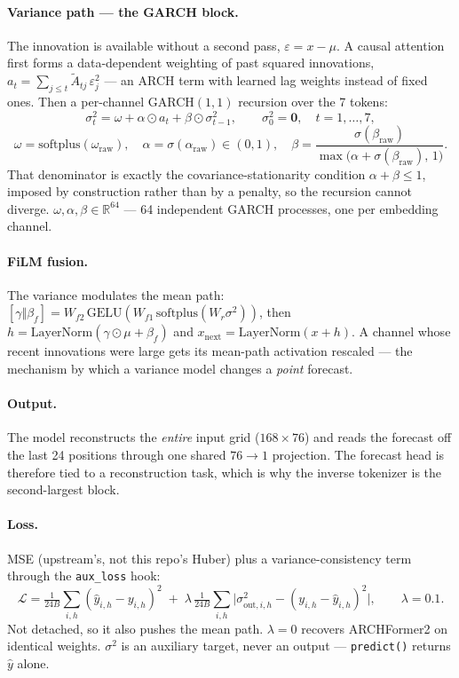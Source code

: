 \documentclass[11pt]{article}
\newcommand{\R}{\mathbb{R}}
\newcommand{\Loss}{\mathcal{L}}
\newcommand{\code}[1]{\texttt{\small #1}}
\newcommand{\LN}{\mathrm{LayerNorm}}
\begin{document}
\paragraph{Variance path --- the GARCH block.} The innovation is available without a
second pass, $\varepsilon = x - \mu$. A causal attention first forms a
data-dependent weighting of past squared innovations,
$a_t = \sum_{j \le t}\tilde A_{tj}\,\varepsilon^2_j$ --- an ARCH term with learned
lag weights instead of fixed ones. Then a per-channel GARCH$(1,1)$ recursion over
the 7 tokens:
\begin{equation}
  \sigma^2_t = \omega + \alpha \odot a_t + \beta \odot \sigma^2_{t-1},
  \qquad \sigma^2_0 = \mathbf{0},\quad t = 1,\ldots,7,
\end{equation}
\begin{equation}
  \omega = \mathrm{softplus}(\omega_{\text{raw}}),
  \quad \alpha = \sigma(\alpha_{\text{raw}}) \in (0,1),
  \quad \beta = \frac{\sigma(\beta_{\text{raw}})}{\max\big(\alpha + \sigma(\beta_{\text{raw}}),\,1\big)} .
\end{equation}
That denominator is exactly the covariance-stationarity condition
$\alpha + \beta \le 1$, imposed by construction rather than by a penalty, so the
recursion cannot diverge. $\omega,\alpha,\beta \in \R^{64}$ --- 64 independent GARCH
processes, one per embedding channel.

\paragraph{FiLM fusion.} The variance modulates the mean path:
$[\gamma \Vert \beta_f] = W_{f2}\,\mathrm{GELU}(W_{f1}\,\mathrm{softplus}(W_r\sigma^2))$,
then $h = \LN(\gamma \odot \mu + \beta_f)$ and $x_{\text{next}} = \LN(x + h)$. A
channel whose recent innovations were large gets its mean-path activation rescaled
--- the mechanism by which a variance model changes a \emph{point} forecast.

\paragraph{Output.} The model reconstructs the \emph{entire} input grid
($168 \times 76$) and reads the forecast off the last 24 positions through one
shared $76\to1$ projection. The forecast head is therefore tied to a reconstruction
task, which is why the inverse tokenizer is the second-largest block.

\paragraph{Loss.} MSE (upstream's, not this repo's Huber) plus a variance-consistency
term through the \code{aux\_loss} hook:
\begin{equation}
  \Loss = \tfrac{1}{24B}\textstyle\sum_{i,h}(\hat y_{i,h}-y_{i,h})^2
  \;+\; \lambda\,\tfrac{1}{24B}\textstyle\sum_{i,h}
  \big|\sigma^2_{\text{out},i,h} - (y_{i,h}-\hat y_{i,h})^2\big|,
  \qquad \lambda = 0.1 .
\end{equation}
Not detached, so it also pushes the mean path. $\lambda = 0$ recovers ARCHFormer2 on
identical weights. $\sigma^2$ is an auxiliary target, never an output ---
\code{predict()} returns $\hat y$ alone.
\end{document}
